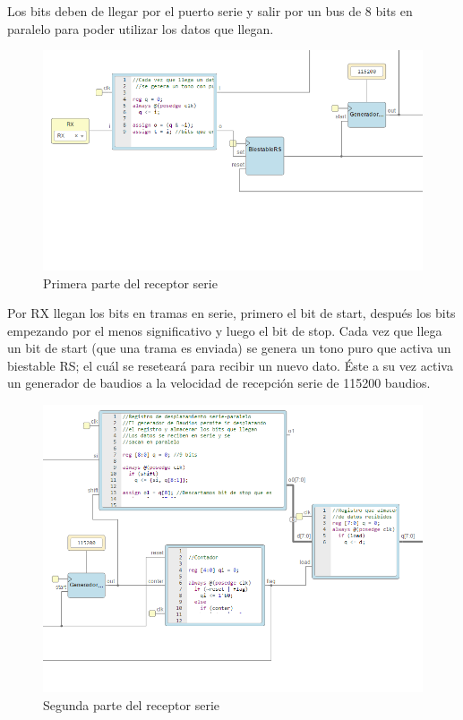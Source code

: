 Los bits deben de llegar por el puerto serie y salir por un bus de 8 bits  en paralelo para poder utilizar los datos que llegan. 
\begin{figure}[H]
	\center
	\includegraphics[scale=0.7]{imagenes/Disenodelsistema/receptorserie1.png}
	\caption{Primera parte del receptor serie}
	\label{fig:receptorserie1}
\end{figure}

Por RX llegan los bits en tramas en serie, primero el bit de start, después los bits empezando por el menos significativo y luego el bit de stop. Cada vez que llega un bit de start (que una trama es enviada) se genera un tono puro que activa un biestable RS; el cuál se reseteará para recibir un nuevo dato. Éste a su vez activa un generador de baudios a la velocidad de recepción serie de 115200 baudios.\newline
\begin{figure}[H]
	\center
	\includegraphics[scale=0.7]{imagenes/Disenodelsistema/receptorserie2.png}
	\caption{Segunda parte del receptor serie}
	\label{fig:receptorserie2}
\end{figure}


